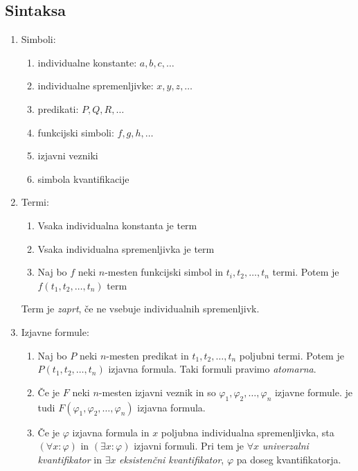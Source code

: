 \documentclass[12pt, a4paper]{article}
\begin{document}
\newpage

\subsection{Sintaksa}

\begin{enumerate}[label=\Alph*)]
\item Simboli:

\begin{enumerate}
\item individualne konstante: $a,b,c,\dots$
\item individualne spremenljivke: $x,y,z,\dots$
\item predikati: $P,Q,R,\dots$
\item funkcijski simboli: $f,g,h,\dots$
\item izjavni vezniki
\item simbola kvantifikacije
\end{enumerate}

\item Termi:

\begin{enumerate}
\item Vsaka individualna konstanta je term
\item Vsaka individualna spremenljivka je term
\item Naj bo $f$ neki $n$-mesten funkcijski simbol in $t_i,t_2,\dots,t_n$ termi. Potem je $f(t_1,t_2,\dots,t_n)$ term
\end{enumerate}

Term je \emph{zaprt}, če ne vsebuje individualnih spremenljivk.

\item Izjavne formule:

\begin{enumerate}
\item Naj bo $P$ neki $n$-mesten predikat in $t_1,t_2,\dots,t_n$ poljubni termi. Potem je $P(t_1,t_2,\dots,t_n)$ izjavna formula. Taki formuli pravimo \emph{atomarna}.
\item Če je $F$ neki $n$-mesten izjavni veznik in so $\varphi_1,\varphi_2,\dots,\varphi_n$ izjavne formule. je tudi $F(\varphi_1,\varphi_2,\dots,\varphi_n)$ izjavna formula.
\item Če je $\varphi$ izjavna formula in $x$ poljubna individualna spremenljivka, sta $(\forall x\colon\varphi)$ in $(\exists x\colon\varphi)$ izjavni formuli. Pri tem je $\forall x$ \emph{univerzalni kvantifikator} in $\exists x$ \emph{eksistenčni kvantifikator}, $\varphi$ pa doseg kvantifikatorja.
\end{enumerate}
\end{enumerate}
\end{document}
